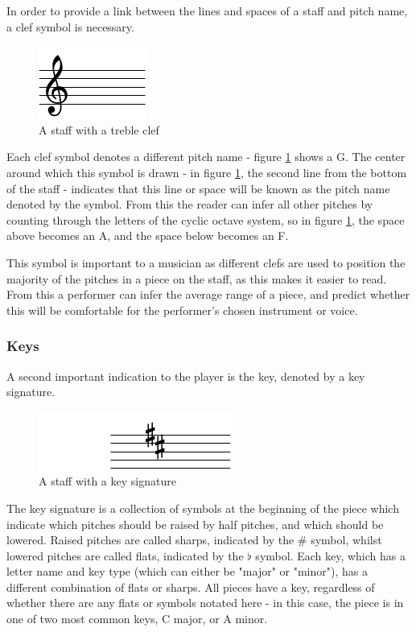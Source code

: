 In order to provide a link between the lines and spaces of a staff and pitch name, a clef symbol is necessary.
\begin{figure}[h]
    \centering
        \includegraphics{clef-crop.pdf}
    \caption{A staff with a treble clef}
    \label{fig:clef}
\end{figure}

Each clef symbol denotes a different pitch name - figure \ref{fig:clef} shows a G. The center around which this symbol is drawn - in figure \ref{fig:clef}, the second line from the bottom of the staff - indicates that this line or space will be known as the pitch name denoted by the symbol. From this the reader can infer all other pitches by counting through the letters of the cyclic octave system, so in figure \ref{fig:clef}, the space above becomes an A, and the space below becomes an F.

This symbol is important to a musician as different clefs are used to position the majority of the pitches in a piece on the staff, as this makes it easier to read. From this a performer can infer the average range of a piece, and predict whether this will be comfortable for the performer's chosen instrument or voice.

\subsubsection{Keys}
A second important indication to the player is the key, denoted by a key signature.
\begin{figure}[h]
    \centering
        \includegraphics{key-crop.pdf}
    \caption{A staff with a key signature}
    \label{fig:key}
\end{figure}

The key signature is a collection of symbols at the beginning of the piece which indicate which pitches should be raised by half pitches, and which should be lowered. Raised pitches are called sharps, indicated by the \# symbol, whilst lowered pitches are called flats, indicated by the $\flat$ symbol. Each key, which has a letter name and key type (which can either be "major" or "minor"), has a different combination of flats or sharps. All pieces have a key, regardless of whether there are any flats or symbols notated here - in this case, the piece is in one of two most common keys, C major, or A minor.

